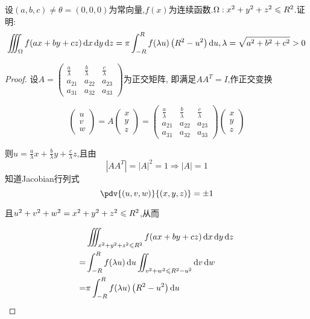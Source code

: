 \begin{example}
    设$(a,b,c) \neq \theta = (0,0,0)$为常向量,$f(x)$为连续函数.$\Omega:x^2 + y^2 + z^2 \leqslant R^2$.证明:
    $$\iiint_\Omega f(ax + by + cz) \operatorname{d\!} x \operatorname{d\!} y \operatorname{d\!} z = \pi \int_{-R}^R f(\lambda u )\left( R^2 - u^2 \right) \operatorname{d\!} u, \lambda = \sqrt{a^2 + b^2 + c^2} >0$$
\end{example}

\begin{proof}
    设$A = \begin{pmatrix}
        \frac{a}{\lambda} & \frac{b}{\lambda} & \frac{c}{\lambda} \\
        a_{21} & a_{22} & a_{23} \\
        a_{31} & a_{32} & a_{33} 
    \end{pmatrix}$为正交矩阵,
    即满足$A A^T = I$,作正交变换

    $$
\begin{pmatrix}
    u \\
    v \\
    w 
\end{pmatrix} = A \begin{pmatrix}
    x \\
    y \\
    z
\end{pmatrix} = \begin{pmatrix}
    \frac{a}{\lambda}  & \frac{b}{\lambda} & \frac{c}{\lambda} \\
    a_{21} & a_{22} & a_{23} \\
    a_{31} & a_{32} & a_{33}
\end{pmatrix} \begin{pmatrix}
    x \\
    y \\
    z
\end{pmatrix}
$$

则$u=\frac{a}{\lambda} x + \frac{b}{\lambda} y + \frac{c}{\lambda} z$,且由
$$\left| {AA^T} \right| = \left|A \right|^2 = 1 \Rightarrow \left| A \right| = 1$$
知道Jacobian行列式$$\pdv{(u,v,w)}{(x,y,z)} = \pm 1$$

且$u^2 + v^2 + w^2 = x^2 + y^2 + z^2 \leqslant R^2$,从而

\begin{align*}
    &\iiint_{x^2 + y^2 + z^2 \leqslant R^2} f(ax + by + cz) \operatorname{d\!} x \operatorname{d\!} y \operatorname{d\!} z\\
    =& \int_{-R}^R f(\lambda u) \operatorname{d\!} u \iint_{v^2 + w^2 \leqslant R^2 - u^2} \operatorname{d\!} v \operatorname{d\!} w\\
    =& \pi \int_{-R}^R f(\lambda u) \left( R^2 - u^2 \right) \operatorname{d\!} u\\
\end{align*}




\end{proof}

